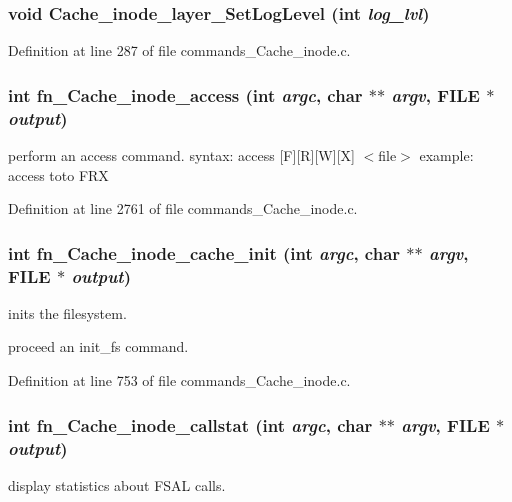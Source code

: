 \subsubsection[{Cache\_\-inode\_\-layer\_\-SetLogLevel}]{\setlength{\rightskip}{0pt plus 5cm}void Cache\_\-inode\_\-layer\_\-SetLogLevel (int {\em log\_\-lvl})}\label{commands_8h_a7440aeb3677f16a9616c85a5c6734c53}


Definition at line 287 of file commands\_\-Cache\_\-inode.c.
\subsubsection[{fn\_\-Cache\_\-inode\_\-access}]{\setlength{\rightskip}{0pt plus 5cm}int fn\_\-Cache\_\-inode\_\-access (int {\em argc}, \/  char $\ast$$\ast$ {\em argv}, \/  FILE $\ast$ {\em output})}\label{commands_8h_a3a0103c605c6c3c40d72196061b5ed4f}
perform an access command. syntax: access [F][R][W][X] $<$file$>$ example: access toto FRX 

Definition at line 2761 of file commands\_\-Cache\_\-inode.c.
\subsubsection[{fn\_\-Cache\_\-inode\_\-cache\_\-init}]{\setlength{\rightskip}{0pt plus 5cm}int fn\_\-Cache\_\-inode\_\-cache\_\-init (int {\em argc}, \/  char $\ast$$\ast$ {\em argv}, \/  FILE $\ast$ {\em output})}\label{commands_8h_a58292719ee6d7fd24c9a9964135f45e1}
inits the filesystem.

proceed an init\_\-fs command. 

Definition at line 753 of file commands\_\-Cache\_\-inode.c.
\subsubsection[{fn\_\-Cache\_\-inode\_\-callstat}]{\setlength{\rightskip}{0pt plus 5cm}int fn\_\-Cache\_\-inode\_\-callstat (int {\em argc}, \/  char $\ast$$\ast$ {\em argv}, \/  FILE $\ast$ {\em output})}\label{commands_8h_a711e4a11e5bf3bb7fd4be1cdb5f33010}
display statistics about FSAL calls. 


